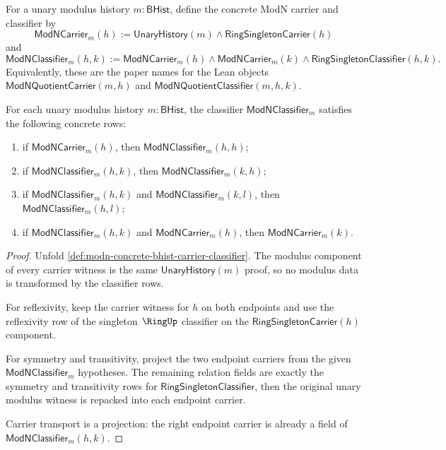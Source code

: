 \begin{definition}
\label{def:modn-concrete-bhist-carrier-classifier}
For a unary modulus history $m:\mathsf{BHist}$, define the concrete ModN
carrier and classifier by
$$
\mathsf{ModNCarrier}_m(h):=\mathsf{UnaryHistory}(m)\land
\mathsf{RingSingletonCarrier}(h)
$$
and
$$
\mathsf{ModNClassifier}_m(h,k):=
\mathsf{ModNCarrier}_m(h)\land
\mathsf{ModNCarrier}_m(k)\land
\mathsf{RingSingletonClassifier}(h,k).
$$
Equivalently, these are the paper names for the Lean objects
$\mathsf{ModNQuotientCarrier}(m,h)$ and
$\mathsf{ModNQuotientClassifier}(m,h,k)$.
\end{definition}

\begin{theorem}
\label{thm:modn-concrete-classifier-rows}
For each unary modulus history $m:\mathsf{BHist}$, the classifier
$\mathsf{ModNClassifier}_m$ satisfies the following concrete rows:
\begin{enumerate}
  \item if $\mathsf{ModNCarrier}_m(h)$, then
  $\mathsf{ModNClassifier}_m(h,h)$;
  \item if $\mathsf{ModNClassifier}_m(h,k)$, then
  $\mathsf{ModNClassifier}_m(k,h)$;
  \item if $\mathsf{ModNClassifier}_m(h,k)$ and
  $\mathsf{ModNClassifier}_m(k,l)$, then
  $\mathsf{ModNClassifier}_m(h,l)$;
  \item if $\mathsf{ModNClassifier}_m(h,k)$ and
  $\mathsf{ModNCarrier}_m(h)$, then $\mathsf{ModNCarrier}_m(k)$.
\end{enumerate}
\end{theorem}
\begin{proof}
Unfold \autoref{def:modn-concrete-bhist-carrier-classifier}. The modulus
component of every carrier witness is the same
$\mathsf{UnaryHistory}(m)$ proof, so no modulus data is transformed by the
classifier rows.

For reflexivity, keep the carrier witness for $h$ on both endpoints and use
the reflexivity row of the singleton $\RingUp$ classifier on the
$\mathsf{RingSingletonCarrier}(h)$ component.

For symmetry and transitivity, project the two endpoint carriers from the
given $\mathsf{ModNClassifier}_m$ hypotheses. The remaining relation fields
are exactly the symmetry and transitivity rows for
$\mathsf{RingSingletonClassifier}$, then the original unary modulus witness is
repacked into each endpoint carrier.

Carrier transport is a projection: the right endpoint carrier is already a
field of $\mathsf{ModNClassifier}_m(h,k)$.
\end{proof}

